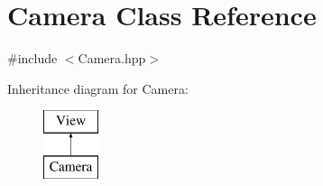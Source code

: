 \hypertarget{class_camera}{}\section{Camera Class Reference}
\label{class_camera}


{\ttfamily \#include $<$Camera.\+hpp$>$}

Inheritance diagram for Camera\+:\begin{figure}[H]
\begin{center}
\leavevmode
\includegraphics[height=2.000000cm]{class_camera}
\end{center}
\end{figure}
